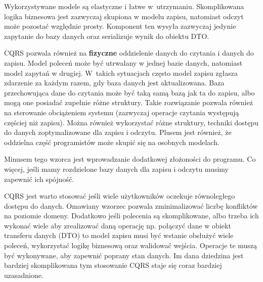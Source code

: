 Wykorzystywane modele są elastyczne i łatwe w~utrzymaniu. Skomplikowana logika biznesowa jest zazwyczaj skupiona w modelu zapisu, natomiast odczyt może pozostać względnie prosty. Komponent ten wysyła zazwyczaj jedynie zapytanie do bazy danych oraz serializuje wynik do obiektu DTO. 

CQRS pozwala również na \textbf{fizyczne} oddzielenie danych do czytania i danych do zapisu. Model poleceń może być utrwalany w jednej bazie danych, natomiast model zapytań w drugiej.  W~takich sytuacjach często model zapisu zgłasza zdarzenie za każdym razem, gdy baza danych jest aktualizowana. Baza przechowująca dane do czytania może być taką samą bazą jak ta do zapisu, albo mogą one posiadać zupełnie różne struktury. Takie rozwiązanie pozwala również na sterowanie obciążeniem systemu (zazwyczaj operacje czytania występują częściej niż zapisu). Można również wykorzystać różne struktury, techniki dostępu do danych zoptymalizowane dla zapisu i odczytu. Plusem jest również, że oddzielna część programistów może skupić się na osobnych modelach.


Minusem tego wzorca jest wprowadzanie dodatkowej złożoności do programu. Co więcej, jeśli mamy rozdzielone bazy danych dla zapisu i odczytu musimy zapewnić ich spójność.

CQRS jest warto stosować jeśli wiele użytkowników oczekuje równoległego dostępu do danych. Omawiany wzorzec pozwala zminimalizować liczbę konfliktów na poziomie domeny. Dodatkowo jeśli polecenia są skomplikowane, albo trzeba ich wykonać wiele aby zrealizować daną operację np. połączyć dane w obiekt transferu danych (DTO) to model zapisu musi być wstanie obsłużyć wiele poleceń, wykorzystać logikę biznesową oraz walidować wejścia. Operacje te muszą być wykonywane, aby zapewnić poprany stan danych. Im dana dziedzina jest bardziej skomplikowana tym stosowanie CQRS staje się coraz bardziej uzasadnione.




